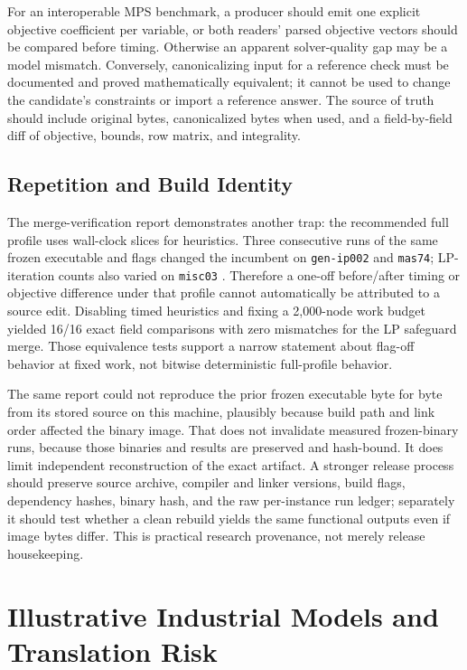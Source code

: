 \documentclass[10pt,a4paper,twocolumn]{article}
\begin{document}
For an interoperable MPS benchmark, a producer should emit one explicit objective coefficient per variable, or both readers' parsed objective vectors should be compared before timing. Otherwise an apparent solver-quality gap may be a model mismatch. Conversely, canonicalizing input for a reference check must be documented and proved mathematically equivalent; it cannot be used to change the candidate's constraints or import a reference answer. The source of truth should include original bytes, canonicalized bytes when used, and a field-by-field diff of objective, bounds, row matrix, and integrality.

\subsection{Repetition and Build Identity}

The merge-verification report demonstrates another trap: the recommended full profile uses wall-clock slices for heuristics. Three consecutive runs of the same frozen executable and flags changed the incumbent on \texttt{gen-ip002} and \texttt{mas74}; LP-iteration counts also varied on \texttt{misc03} \cite{merge}. Therefore a one-off before/after timing or objective difference under that profile cannot automatically be attributed to a source edit. Disabling timed heuristics and fixing a 2,000-node work budget yielded 16/16 exact field comparisons with zero mismatches for the LP safeguard merge. Those equivalence tests support a narrow statement about flag-off behavior at fixed work, not bitwise deterministic full-profile behavior.

The same report could not reproduce the prior frozen executable byte for byte from its stored source on this machine, plausibly because build path and link order affected the binary image. That does not invalidate measured frozen-binary runs, because those binaries and results are preserved and hash-bound. It does limit independent reconstruction of the exact artifact. A stronger release process should preserve source archive, compiler and linker versions, build flags, dependency hashes, binary hash, and the raw per-instance run ledger; separately it should test whether a clean rebuild yields the same functional outputs even if image bytes differ. This is practical research provenance, not merely release housekeeping.

\section{Illustrative Industrial Models and Translation Risk}
\end{document}
